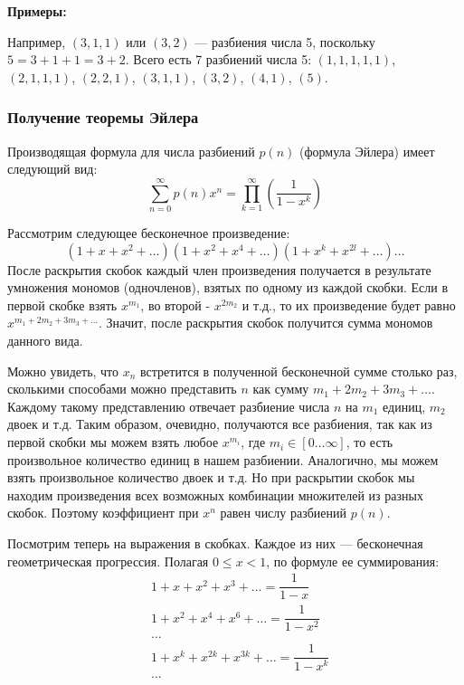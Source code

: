 \noindent\textbf{Примеры:}

Например, $(3,1,1)$ или $(3,2)$ — разбиения числа 5, поскольку$ 5=3+1+1=3+2$. Всего есть 7 разбиений числа 5: $(1,1,1,1,1)$, $(2,1,1,1)$, $(2,2,1)$, $(3,1,1)$, $(3,2)$, $(4,1)$, $(5)$.

\subsubsection*{Получение теоремы Эйлера}

Производящая формула для числа разбиений $p(n)$ (формула Эйлера) имеет следующий вид:
\[ \sum_{n=0}^\infty p(n)x^n = \prod_{k=1}^\infty \left(\frac {1}{1-x^k} \right) \]

Рассмотрим следующее бесконечное произведение:
\[ (1 + x + x^2 + \dots)(1 + x^2 + x^4 + \dots)(1 + x^k + x^{2l} + \dots) \dots \]
После раскрытия скобок каждый член произведения получается в результате умножения мономов (одночленов), взятых по одному из каждой скобки. Если в первой скобке взять $x^{m_1}$, во второй - $x^{2m_2}$ и т.д., то их произведение будет равно $x^{m_1 + 2m_2 + 3m_3 + \dots}$. Значит, после раскрытия скобок получится сумма мономов данного вида.

Можно увидеть, что $x_n$ встретится в полученной бесконечной сумме столько раз, сколькими способами можно представить $n$ как сумму $m_1 + 2m_2 + 3m_3 + \dots$. Каждому такому представлению отвечает разбиение числа $n$ на $m_1$ единиц, $m_2$ двоек и т.д. Таким образом, очевидно, получаются все разбиения, так как из первой скобки мы можем взять любое $x^{m_i}$, где $m_i \in [0 \dots \infty]$, то есть произвольное количество единиц в нашем разбиении. Аналогично, мы можем взять произвольное количество двоек и т.д. Но при раскрытии скобок мы находим произведения всех возможных комбинации множителей из разных скобок. Поэтому коэффициент при $x^n$ равен числу разбиений $p(n)$.

Посмотрим теперь на выражения в скобках. Каждое из них — бесконечная геометрическая прогрессия. Полагая $0 \le x < 1$, по формуле ее суммирования:
\begin{align}
	& 1 + x + x^2 + x^3 + \dots = \dfrac{1}{1 - x} \\
	& 1 + x^2 + x^4 + x^6 + \dots = \dfrac{1}{1 - x^2} \\
	& \dots \\
	& 1 + x^k + x^{2k} + x^{3k} + \dots = \dfrac{1}{1 - x^k} \\
	& \dots \\
\end{align}

